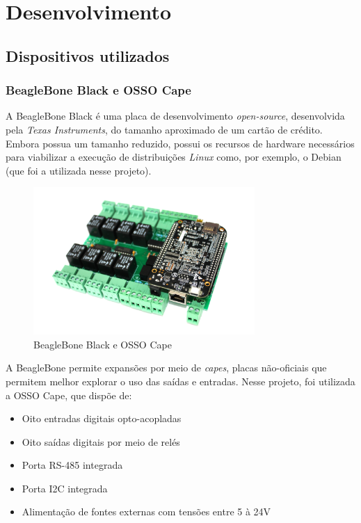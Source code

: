 \chapter{Desenvolvimento}
\label{methodology}

  \section{Dispositivos utilizados} 
  \label{methodology:devices}

    \subsection{BeagleBone Black e OSSO Cape} 
    \label{methodology:devices:bbb}

      A BeagleBone Black é uma placa de desenvolvimento \textit{open-source}, desenvolvida pela \textit{Texas Instruments}, do tamanho aproximado de um cartão de crédito. Embora possua um tamanho reduzido, possui os recursos de hardware necessários para viabilizar a execução de distribuições \textit{Linux} como, por exemplo, o Debian (que foi a utilizada nesse projeto).

      \begin{figure}[H]
        \begin{center}
          \includegraphics[width=0.75\textwidth,natwidth=585,natheight=180]{assets/images/devices-beaglebone.jpg}
          \caption{BeagleBone Black e OSSO Cape}
          \label{fig:bbb}
        \end{center}
      \end{figure}

      A BeagleBone permite expansões por meio de \textit{capes}, placas não-oficiais que permitem melhor explorar o uso das saídas e entradas. Nesse projeto, foi utilizada a OSSO Cape, que dispõe de:

      \begin{itemize}
        \item Oito entradas digitais opto-acopladas
        \item Oito saídas digitais por meio de relés
        \item Porta RS-485 integrada
        \item Porta I2C integrada
        \item Alimentação de fontes externas com tensões entre 5 à 24V
      \end{itemize}

